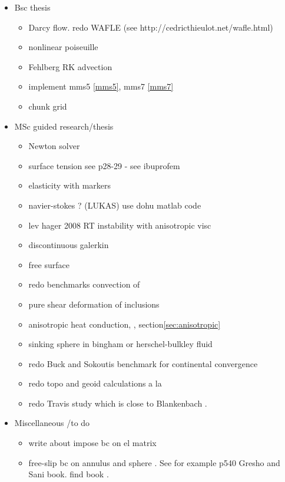 
\begin{itemize}
\item Bsc thesis
\begin{itemize} 
\item Darcy flow. redo WAFLE (see http://cedricthieulot.net/wafle.html)
\item nonlinear poiseuille
\item Fehlberg RK advection
\item implement mms5 \ref{mms5}, mms7 \ref{mms7}
\item chunk grid
\end{itemize}
\item MSc guided research/thesis
\begin{itemize} 
\item Newton solver
\item surface tension see \cite{reddybook2}p28-29 - see ibuprofem 
\item elasticity with markers
\item navier-stokes ? (LUKAS) use dohu matlab code
\item lev hager 2008 RT instability with anisotropic visc
\item discontinuous galerkin
\item free surface \cite{dumy16} 
\item redo benchmarks convection of \cite{trab90}
\item pure shear deformation of inclusions \cite{trla00}
\item anisotropic heat conduction\cite[p121]{reddybook2}, \cite[p143]{reddybook2}, section\ref{sec:anisotropic}
\item sinking sphere in bingham or herschel-bulkley fluid \cite{bemj04} 
\item redo Buck and Sokoutis benchmark for continental convergence \cite{buso94}
\item redo topo and geoid calculations a la \cite{king09}
\item redo Travis study \cite{trab90} which is close to Blankenbach \cite{blbc89}.
\end{itemize}
\item Miscellaneous /to do
\begin{itemize} 
\item write about impose bc on el matrix
\item free-slip bc on annulus and sphere . See for example p540 Gresho and Sani book. find book \cite{deab72}.

\end{itemize}
\end{itemize}

